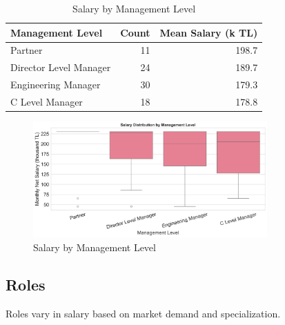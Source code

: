 \documentclass[12pt,a4paper]{article}
\begin{document}
\begin{table}[H]
	\centering
	\small
	\begin{tabular}{lrr}
		\toprule
		\textbf{Management Level} & \textbf{Count} & \textbf{Mean Salary (k TL)} \\
		\midrule
		Partner                   & 11             & 198.7                       \\
		Director Level Manager    & 24             & 189.7                       \\
		Engineering Manager       & 30             & 179.3                       \\
		C Level Manager           & 18             & 178.8                       \\
		\bottomrule
	\end{tabular}
	\caption{Salary by Management Level}
\end{table}
\begin{figure}[H]
	\centering
	\includegraphics[width=0.8\textwidth]{figures/boxplot_management_level.png}
	\caption{Salary by Management Level}
\end{figure}

\subsection{Roles}
Roles vary in salary based on market demand and specialization.
\end{document}
